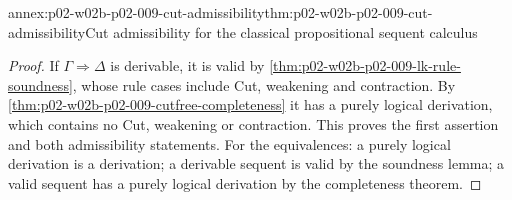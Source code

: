 \begin{annexitem}{annex:p02-w02b-p02-009-cut-admissibility}{thm:p02-w02b-p02-009-cut-admissibility}{Cut admissibility for the classical propositional sequent calculus}
\begin{proof}
If \(\Gamma\Rightarrow\Delta\) is derivable, it is valid by
\cref{thm:p02-w02b-p02-009-lk-rule-soundness}, whose rule cases include Cut,
weakening and contraction.  By
\cref{thm:p02-w02b-p02-009-cutfree-completeness} it has a purely logical
derivation, which contains no Cut, weakening or contraction.  This proves
the first assertion and both admissibility statements.  For the
equivalences: a purely logical derivation is a derivation; a derivable
sequent is valid by the soundness lemma; a valid sequent has a purely logical
derivation by the completeness theorem.
\end{proof}
\end{annexitem}

